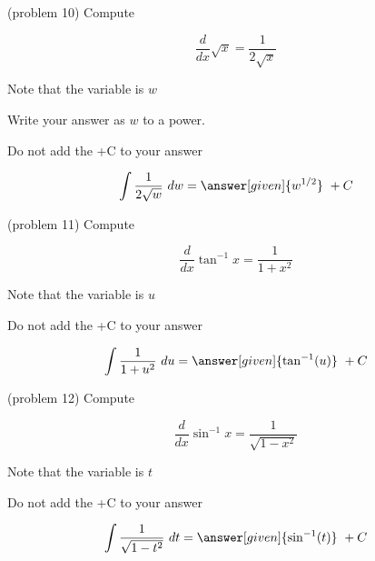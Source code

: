 \documentclass[handout]{ximera}
\begin{document}
\begin{problem}(problem 10)
Compute 

\begin{hint}
\[
\frac{d}{dx} \sqrt x = \frac{1}{2\sqrt x}
\]
\end{hint}
\begin{hint}
Note that the variable is $w$
\end{hint}
\begin{hint}
Write your answer as $w$ to a power.
\end{hint}
\begin{hint}
\begin{center}
Do not add the +C to your answer
\end{center}
\end{hint}

\[
\int \frac{1}{2\sqrt w} \ dw =
\answer[given]{w^{1/2}} \ + C
\]
\end{problem}





\begin{problem}(problem 11)
Compute 

\begin{hint}
\[
\frac{d}{dx} \tan^{-1} x = \frac{1}{1+x^2}
\]
\end{hint}
\begin{hint}
Note that the variable is $u$
\end{hint}
\begin{hint}
\begin{center}
Do not add the +C to your answer
\end{center}
\end{hint}

\[
\int \frac{1}{1+u^2} \ du =
\answer[given]{\tan^{-1}(u)} \ + C
\]
\end{problem}




\begin{problem}(problem 12)
Compute 

\begin{hint}
\[
\frac{d}{dx} \sin^{-1} x = \frac{1}{\sqrt{1 - x^2}}
\]
\end{hint}
\begin{hint}
Note that the variable is $t$
\end{hint}
\begin{hint}
\begin{center}
Do not add the +C to your answer
\end{center}
\end{hint}

\[
\int \frac{1}{\sqrt{1 - t^2}} \ dt =
\answer[given]{\sin^{-1}(t)} \ + C
\]
\end{problem}
\end{document}
